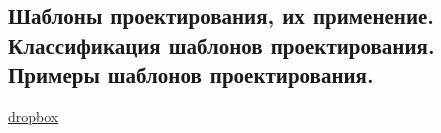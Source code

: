 \subsection{Шаблоны проектирования, их применение. Классификация шаблонов проектирования. Примеры шаблонов проектирования.}

\href{https://www.dropbox.com/sh/4st5b16mvdf8gkj/AACWB4gDVx73cjp5xudo1nGma/Programming/18%20%D0%A8%D0%B0%D0%B1%D0%BB%D0%BE%D0%BD%D1%8B%20%D0%BF%D1%80%D0%BE%D0%B5%D0%BA%D1%82%D0%B8%D1%80%D0%BE%D0%B2%D0%B0%D0%BD%D0%B8%D1%8F.pdf?dl=0}{dropbox}